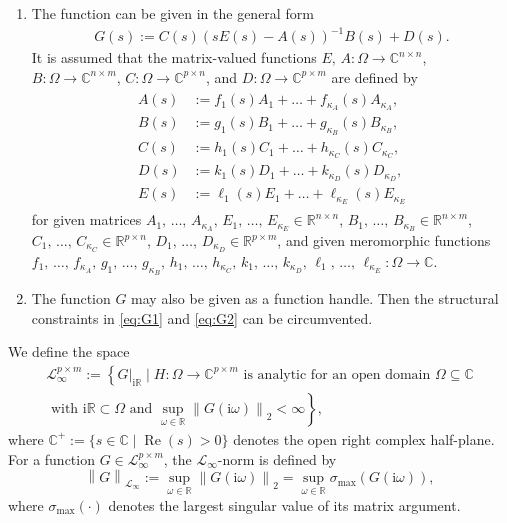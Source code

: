 \documentclass[10pt,a4paper]{article}
\begin{document}
\begin{enumerate}
    \item The function can be given in the general form
        \begin{align} \label{eq:G1}
        G(s) := C(s)(sE(s) - A(s))^{-1}B(s) + D(s).
        \end{align}
         It is assumed that the matrix-valued functions $E,\,A: \Omega \rightarrow \mathbb{C}^{n \times n}$, $B: \Omega \rightarrow \mathbb{C}^{n \times m}$, $C: \Omega \rightarrow \mathbb{C}^{p \times n}$, and $D:\Omega \rightarrow \mathbb{C}^{p \times m}$ are defined by
        \begin{align} \label{eq:G2}
        \begin{split}
        A(s)&:= f_1(s)A_1 + \dots + f_{\kappa_A}(s)A_{\kappa_A}, \\
        B(s)&:= g_1(s)B_1 + \dots + g_{\kappa_B}(s)B_{\kappa_B}, \\
        C(s)&:= h_1(s)C_1 + \dots + h_{\kappa_C}(s)C_{\kappa_C}, \\
        D(s)&:= k_1(s)D_1 + \dots + k_{\kappa_D}(s)D_{\kappa_D}, \\
        E(s)&:= \ell_1(s)E_1 + \dots + \ell_{\kappa_E}(s)E_{\kappa_E}
        \end{split}
        \end{align}
        for given matrices $A_1,\,\ldots,\,A_{\kappa_A},\,E_1,\,\ldots,\,E_{\kappa_E} \in \mathbb{R}^{n \times n}$, $B_1,\,\ldots,\,B_{\kappa_B} \in \mathbb{R}^{n \times m}$, $C_1,\,\ldots,\, C_{\kappa_C} \in \mathbb{R}^{p \times n}$, $D_1,\,\ldots,\,D_{\kappa_D} \in \mathbb{R}^{p \times m}$, and given meromorphic functions $f_1,\,\ldots,\,f_{\kappa_A},\,g_1,\,\ldots,\,g_{\kappa_B},\,h_1,\,\ldots,\,h_{\kappa_C},\,k_1,\,\ldots,\,k_{\kappa_D},\,\ell_1,\,\ldots,\, \ell_{\kappa_E}: \Omega \rightarrow \mathbb{C}$. 
    \item The function $G$ may also be given as a function handle. Then the structural constraints in \eqref{eq:G1} and \eqref{eq:G2} can be circumvented. 
\end{enumerate}

We define the space
\begin{multline*}
 \mathcal{L}_\infty^{p \times m} := \left\{ G|_{\mathrm{i}\mathbb{R}} \; \bigg| \; H : \Omega \rightarrow \mathbb{C}^{p \times m} \text{ is analytic for an open domain } \Omega \subseteq \mathbb{C} \right. \\ \left. \text{ with } \mathrm{i}\mathbb{R} \subset \Omega \text{ and } \sup_{\omega \in \mathbb{R}}\left\| G(\mathrm{i}\omega) \right\|_2 < \infty \right\}, 
\end{multline*}
where $\mathbb{C}^+:=\{ s \in \mathbb{C} \;|\; \operatorname{Re}(s) > 0 \}$ denotes the open right complex half-plane.
For a function $G \in \mathcal{L}_\infty^{p \times m}$, the $\mathcal{L}_\infty$-norm is defined by
\begin{equation*}
 \left\| G \right\|_{\mathcal{L}_\infty} := \sup_{\omega \in \mathbb{R}} \left\| G(\mathrm{i}\omega) \right\|_2 = \sup_{\omega \in \mathbb{R}} \sigma_{\max}(G(\mathrm{i}\omega)), 
\end{equation*}
where $\sigma_{\max}(\cdot)$ denotes the largest singular value of its matrix argument.
\end{document}
